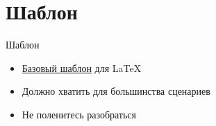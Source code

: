 \section{Шаблон}

\begin{frame}{Шаблон}

\begin{itemize}
    \item \href{https://github.com/TmLev/tex-template/tree/master/src}{\color{blue} Базовый шаблон} для \LaTeX
    \item Должно хватить для большинства сценариев
    \item Не поленитесь разобраться
\end{itemize}

\end{frame}
